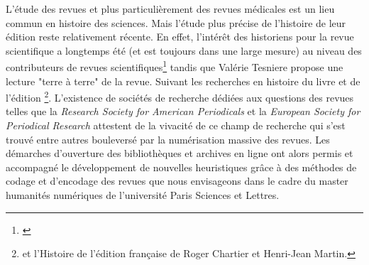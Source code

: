 L'étude des revues et plus particulièrement des revues médicales est un lieu commun en histoire des sciences. Mais l'étude plus précise de l'histoire de leur édition reste relativement récente. En effet, l'intérêt des historiens pour la revue scientifique a longtemps été (et est toujours dans une large mesure) au niveau des contributeurs de revues scientifiques\footnote{\cite{csiszar_scientific_2018}} tandis que Valérie Tesniere propose une lecture "terre à terre" de la revue. Suivant les recherches en histoire du livre et de l'édition \footnote{\cite{mollier_argent_1988} et l'Histoire de l'édition française de Roger Chartier et Henri-Jean Martin.}. L'existence de sociétés de recherche dédiées aux questions des revues telles que la  \textit{Research Society for American Periodicals} et la \textit{European Society for Periodical Research} attestent de la vivacité de ce champ de recherche qui s'est trouvé entre autres bouleversé par la numérisation massive des revues. Les démarches d'ouverture des bibliothèques et archives en ligne ont alors permis et accompagné le développement de nouvelles heuristiques grâce à des méthodes de codage et d'encodage des revues que nous envisageons dans le cadre du master humanités numériques de l'université Paris Sciences et Lettres. 




